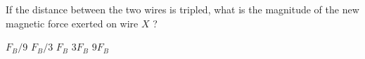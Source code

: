 \begin{questions}\setcounter{question}{7}\question
If the distance between the two wires is tripled, what is the magnitude of the new magnetic force exerted on wire $X$ ?

\begin{oneparchoices}
\choice $F_{B} / 9$
\choice $F_{B} / 3$
\choice $F_{B}$
\choice $3 F_{B}$
\choice $9 F_{B}$
\end{oneparchoices}\end{questions}

